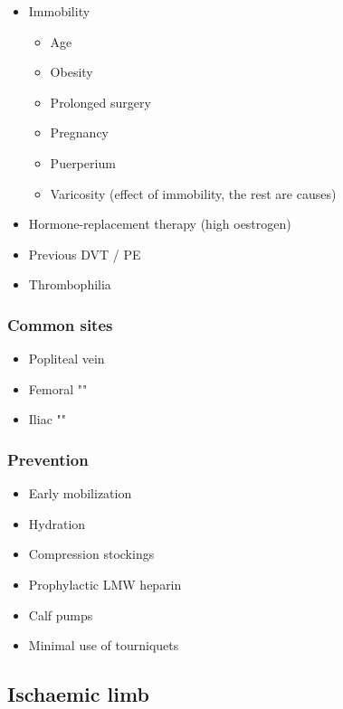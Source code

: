 \documentclass[
  14pt,
]{extarticle}
\providecommand{\tightlist}{%
  \setlength{\itemsep}{0pt}\setlength{\parskip}{0pt}}
\begin{document}
\begin{itemize}
\tightlist
\item
  Immobility

  \begin{itemize}
  \tightlist
  \item
    Age
  \item
    Obesity
  \item
    Prolonged surgery
  \item
    Pregnancy
  \item
    Puerperium
  \item
    Varicosity (effect of immobility, the rest are causes)
  \end{itemize}
\item
  Hormone-replacement therapy (high oestrogen)
\item
  Previous DVT / PE
\item
  Thrombophilia
\end{itemize}

\hypertarget{common-sites}{%
\subsubsection{Common sites}\label{common-sites}}

\begin{itemize}
\tightlist
\item
  Popliteal vein
\item
  Femoral ""
\item
  Iliac ""
\end{itemize}

\hypertarget{prevention}{%
\subsubsection{Prevention}\label{prevention}}

\begin{itemize}
\tightlist
\item
  Early mobilization
\item
  Hydration
\item
  Compression stockings
\item
  Prophylactic LMW heparin
\item
  Calf pumps
\item
  Minimal use of tourniquets
\end{itemize}

\pagebreak

\hypertarget{ischaemic-limb}{%
\subsection{Ischaemic limb}\label{ischaemic-limb}}
\end{document}
